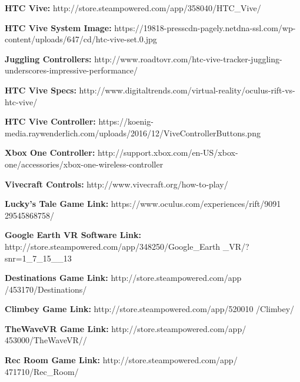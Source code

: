 \documentclass[journal]{IEEEtran}
\begin{document}
\begin{thebibliography}{10}
	
	 	\textbf{HTC Vive:} http://store.steampowered.com/app/358040/HTC\_Vive/

	\textbf{HTC Vive System Image:} https://19818-presscdn-pagely.netdna-ssl.com/wp-content/uploads/647/cd/htc-vive-set.0.jpg

	\textbf{Juggling Controllers:} http://www.roadtovr.com/htc-vive-tracker-juggling-underscores-impressive-performance/
	
	\textbf{HTC Vive Specs:} http://www.digitaltrends.com/virtual-reality/oculus-rift-vs-htc-vive/
	
	
	\textbf{HTC Vive Controller:} https://koenig-media.raywenderlich.com/uploads/2016/12/ViveControllerButtons.png
	
	\textbf{Xbox One Controller:} http://support.xbox.com/en-US/xbox-one/accessories/xbox-one-wireless-controller
		
	\textbf{Vivecraft Controls:} http://www.vivecraft.org/how-to-play/
	
	\textbf{Lucky's Tale Game Link:} https://www.oculus.com/experiences/rift/9091\hspace{1cm} 29545868758/
	
	\textbf{Google Earth VR Software Link:} http://store.steampowered.com/app/348250/Google\_Earth\hspace{1cm} \_VR/?snr=1\_7\_15\_\_13
	
	\textbf{Destinations Game Link:} http://store.steampowered.com/app\hspace{1cm} /453170/Destinations/
	
	\textbf{Climbey Game Link:} http://store.steampowered.com/app/520010\hspace{1cm} /Climbey/
	
	\textbf{TheWaveVR Game Link:} http://store.steampowered.com/app/\hspace{1cm} 453000/TheWaveVR//
	
	\textbf{Rec Room Game Link:} http://store.steampowered.com/app/\hspace{1cm} 471710/Rec\_Room/
	

\end{thebibliography}
\end{document}
